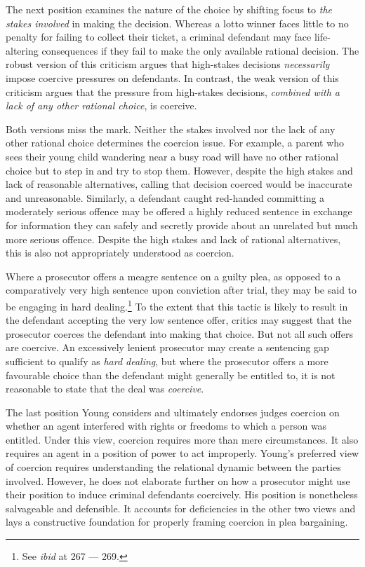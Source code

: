 The next position examines the nature of the choice by shifting focus to \textit{the stakes involved} in making the decision. Whereas a lotto winner faces little to no penalty for failing to collect their ticket, a criminal defendant may face life-altering consequences if they fail to make the only available rational decision. The robust version of this criticism argues that high-stakes decisions \textit{necessarily} impose coercive pressures on defendants. In contrast, the weak version of this criticism argues that the pressure from high-stakes decisions, \textit{combined with a lack of any other rational choice}, is coercive. 

Both versions miss the mark. Neither the stakes involved nor the lack of any other rational choice determines the coercion issue. For example, a parent who sees their young child wandering near a busy road will have no other rational choice but to step in and try to stop them. However, despite the high stakes and lack of reasonable alternatives, calling that decision coerced would be inaccurate and unreasonable. Similarly, a defendant caught red-handed committing a moderately serious offence may be offered a highly reduced sentence in exchange for information they can safely and secretly provide about an unrelated but much more serious offence. Despite the high stakes and lack of rational alternatives, this is also not appropriately understood as coercion.

Where a prosecutor offers a meagre sentence on a guilty plea, as opposed to a comparatively very high sentence upon conviction after trial, they may be said to be engaging in hard dealing.\footnote{See \textit{ibid} at 267 — 269.} To the extent that this tactic is likely to result in the defendant accepting the very low sentence offer, critics may suggest that the prosecutor coerces the defendant into making that choice. But not all such offers are coercive. An excessively lenient prosecutor may create a sentencing gap sufficient to qualify as \textit{hard dealing}, but where the prosecutor offers a more favourable choice than the defendant might generally be entitled to, it is not reasonable to state that the deal was \textit{coercive}.

The last position Young considers and ultimately endorses judges coercion on whether an agent interfered with rights or freedoms to which a person was entitled. Under this view, coercion requires more than mere circumstances. It also requires an agent in a position of power to act improperly. Young's preferred view of coercion requires understanding the relational dynamic between the parties involved. However, he does not elaborate further on how a prosecutor might use their position to induce criminal defendants coercively. His position is nonetheless salvageable and defensible. It accounts for deficiencies in the other two views and lays a constructive foundation for properly framing coercion in plea bargaining.


